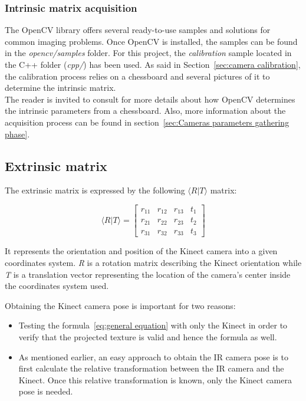 \subsubsection{Intrinsic matrix acquisition}
\label{sec:intrinsic acquisition}

The OpenCV library offers several ready-to-use samples and solutions for common imaging problems. Once OpenCV is installed, the samples can be found in the \textit{opencv/samples} folder. For this project, the \textit{calibration} sample located in the C++ folder (\textit{cpp/}) has been used. As said in Section~\ref{sec:camera calibration}, the calibration process relies on a chessboard and several pictures of it to determine the intrinsic matrix.\\

The reader is invited to consult \cite{zhang_flexible_1999} for more details about how OpenCV determines the intrinsic parameters from a chessboard. Also, more information about the acquisition process can be found in section~\ref{sec:Cameras parameters gathering phase}.


\subsection{Extrinsic matrix}

The extrinsic matrix is expressed by the following $\langle R\vert T\rangle$ matrix:

\begin{equation}
\label{eq:extrinsic}
\langle R\vert T\rangle =  \begin{bmatrix}
       r_{11} & r_{12} & r_{13} & t_1 \\
       r_{21} & r_{22} & r_{23} & t_2\\
       r_{31} & r_{32} & r_{33} & t_3
     \end{bmatrix}
\end{equation}  

It represents the orientation and position of the Kinect camera into a given coordinates system. \textit{R} is a rotation matrix describing the Kinect orientation while \textit{T} is a translation vector representing the location of the camera's center inside the coordinates system used.

Obtaining the Kinect camera pose is important for two reasons: 

\begin{itemize}
  \item Testing the formula~\ref{eq:general equation} with only the Kinect in order to verify that the projected texture is valid and hence the formula as well.
  \item As mentioned earlier, an easy approach to obtain the IR camera pose is to first calculate the relative transformation between the IR camera and the Kinect. Once this relative transformation is known, only the Kinect camera pose is needed. 
\end{itemize}

